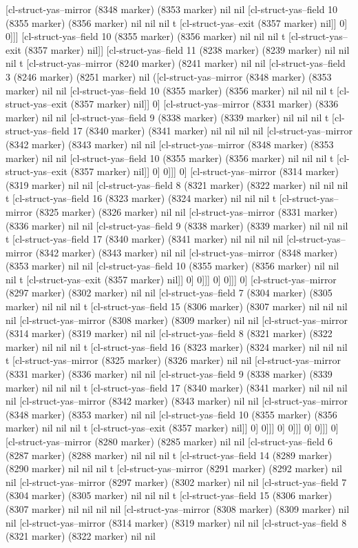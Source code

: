 {{[cl-struct-yas--mirror (8348 marker) (8353 marker) nil nil [cl-struct-yas--field 10 (8355 marker) (8356 marker) nil nil nil t [cl-struct-yas--exit (8357 marker) nil]] 0] 0]]] [cl-struct-yas--field 10 (8355 marker) (8356 marker) nil nil nil t [cl-struct-yas--exit (8357 marker) nil]] [cl-struct-yas--field 11 (8238 marker) (8239 marker) nil nil nil t [cl-struct-yas--mirror (8240 marker) (8241 marker) nil nil [cl-struct-yas--field 3 (8246 marker) (8251 marker) nil ([cl-struct-yas--mirror (8348 marker) (8353 marker) nil nil [cl-struct-yas--field 10 (8355 marker) (8356 marker) nil nil nil t [cl-struct-yas--exit (8357 marker) nil]] 0] [cl-struct-yas--mirror (8331 marker) (8336 marker) nil nil [cl-struct-yas--field 9 (8338 marker) (8339 marker) nil nil nil t [cl-struct-yas--field 17 (8340 marker) (8341 marker) nil nil nil nil [cl-struct-yas--mirror (8342 marker) (8343 marker) nil nil [cl-struct-yas--mirror (8348 marker) (8353 marker) nil nil [cl-struct-yas--field 10 (8355 marker) (8356 marker) nil nil nil t [cl-struct-yas--exit (8357 marker) nil]] 0] 0]]] 0] [cl-struct-yas--mirror (8314 marker) (8319 marker) nil nil [cl-struct-yas--field 8 (8321 marker) (8322 marker) nil nil nil t [cl-struct-yas--field 16 (8323 marker) (8324 marker) nil nil nil t [cl-struct-yas--mirror (8325 marker) (8326 marker) nil nil [cl-struct-yas--mirror (8331 marker) (8336 marker) nil nil [cl-struct-yas--field 9 (8338 marker) (8339 marker) nil nil nil t [cl-struct-yas--field 17 (8340 marker) (8341 marker) nil nil nil nil [cl-struct-yas--mirror (8342 marker) (8343 marker) nil nil [cl-struct-yas--mirror (8348 marker) (8353 marker) nil nil [cl-struct-yas--field 10 (8355 marker) (8356 marker) nil nil nil t [cl-struct-yas--exit (8357 marker) nil]] 0] 0]]] 0] 0]]] 0] [cl-struct-yas--mirror (8297 marker) (8302 marker) nil nil [cl-struct-yas--field 7 (8304 marker) (8305 marker) nil nil nil t [cl-struct-yas--field 15 (8306 marker) (8307 marker) nil nil nil nil [cl-struct-yas--mirror (8308 marker) (8309 marker) nil nil [cl-struct-yas--mirror (8314 marker) (8319 marker) nil nil [cl-struct-yas--field 8 (8321 marker) (8322 marker) nil nil nil t [cl-struct-yas--field 16 (8323 marker) (8324 marker) nil nil nil t [cl-struct-yas--mirror (8325 marker) (8326 marker) nil nil [cl-struct-yas--mirror (8331 marker) (8336 marker) nil nil [cl-struct-yas--field 9 (8338 marker) (8339 marker) nil nil nil t [cl-struct-yas--field 17 (8340 marker) (8341 marker) nil nil nil nil [cl-struct-yas--mirror (8342 marker) (8343 marker) nil nil [cl-struct-yas--mirror (8348 marker) (8353 marker) nil nil [cl-struct-yas--field 10 (8355 marker) (8356 marker) nil nil nil t [cl-struct-yas--exit (8357 marker) nil]] 0] 0]]] 0] 0]]] 0] 0]]] 0] [cl-struct-yas--mirror (8280 marker) (8285 marker) nil nil [cl-struct-yas--field 6 (8287 marker) (8288 marker) nil nil nil t [cl-struct-yas--field 14 (8289 marker) (8290 marker) nil nil nil t [cl-struct-yas--mirror (8291 marker) (8292 marker) nil nil [cl-struct-yas--mirror (8297 marker) (8302 marker) nil nil [cl-struct-yas--field 7 (8304 marker) (8305 marker) nil nil nil t [cl-struct-yas--field 15 (8306 marker) (8307 marker) nil nil nil nil [cl-struct-yas--mirror (8308 marker) (8309 marker) nil nil [cl-struct-yas--mirror (8314 marker) (8319 marker) nil nil [cl-struct-yas--field 8 (8321 marker) (8322 marker) nil nil }}
